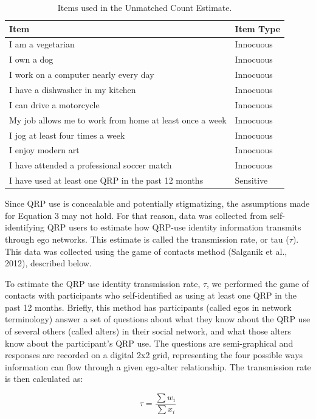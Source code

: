 \documentclass[jou]{apa6}
\theoremstyle{definition}
\theoremstyle{definition}
\theoremstyle{definition}
\theoremstyle{remark}
\begin{document}
\begin{table}

\caption{\label{tab:UCT}Items used in the Unmatched Count Estimate.}
\centering
\fontsize{9}{11}\selectfont
\begin{tabular}[t]{>{\raggedright\arraybackslash}p{6.3cm}l}
\toprule
Item & Item Type\\
\midrule
I am a vegetarian & Innocuous\\
I own a dog & Innocuous\\
I work on a computer nearly every day & Innocuous\\
I have a dishwasher in my kitchen & Innocuous\\
I can drive a motorcycle & Innocuous\\
\addlinespace
My job allows me to work from home at least once a week & Innocuous\\
I jog at least four times a week & Innocuous\\
I enjoy modern art & Innocuous\\
I have attended a professional soccer match & Innocuous\\
I have used at least one QRP in the past 12 months & Sensitive\\
\bottomrule
\end{tabular}
\end{table}

Since QRP use is concealable and potentially stigmatizing, the
assumptions made for Equation 3 may not hold. For that reason, data was
collected from self-identifying QRP users to estimate how QRP-use
identity information transmits through ego networks. This estimate is
called the transmission rate, or tau (\(\tau\)). This data was collected
using the game of contacts method (Salganik et al., 2012), described
below.

To estimate the QRP use identity transmission rate, \(\tau\), we
performed the game of contacts with participants who self-identified as
using at least one QRP in the past 12 months. Briefly, this method has
participants (called egos in network terminology) answer a set of
questions about what they know about the QRP use of several others
(called alters) in their social network, and what those alters know
about the participant's QRP use. The questions are semi-graphical and
responses are recorded on a digital 2x2 grid, representing the four
possible ways information can flow through a given ego-alter
relationship. The transmission rate is then calculated as:

\begin{equation}
\tau = \frac{\sum{w_i}}{\sum{x_i}}
\end{equation}
\end{document}
